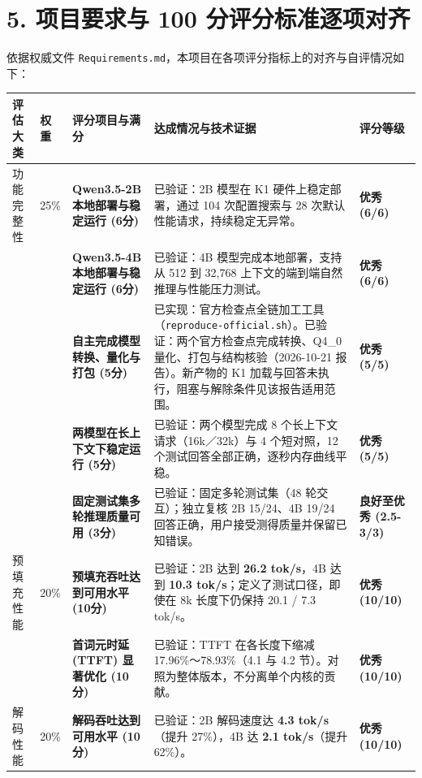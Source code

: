 \documentclass[10pt,a4paper,fontset=none]{ctexart}
\begin{document}
\section{5. 项目要求与 100 分评分标准逐项对齐}

依据权威文件 \texttt{Requirements.md}，本项目在各项评分指标上的对齐与自评情况如下：

\begin{scriptsize}
\setlength{\tabcolsep}{3pt}
\begin{longtable}{@{}p{1.9cm}p{0.9cm}p{4.3cm}p{6.9cm}p{2.0cm}@{}}
\toprule
\textbf{评估大类} & \textbf{权重} & \textbf{评分项目与满分} & \textbf{达成情况与技术证据} & \textbf{评分等级} \\
\midrule
\endhead
功能完整性 & 25\% & \textbf{Qwen3.5-2B 本地部署与稳定运行 (6分)} & 已验证：2B 模型在 K1 硬件上稳定部署，通过 104 次配置搜索与 28 次默认性能请求，持续稳定无异常。 & \textbf{优秀 (6/6)} \\
 & & \textbf{Qwen3.5-4B 本地部署与稳定运行 (6分)} & 已验证：4B 模型完成本地部署，支持从 512 到 32,768 上下文的端到端自然推理与性能压力测试。 & \textbf{优秀 (6/6)} \\
 & & \textbf{自主完成模型转换、量化与打包 (5分)} & 已实现：官方检查点全链加工工具（\texttt{reproduce-official.sh}）。已验证：两个官方检查点完成转换、Q4\_0 量化、打包与结构核验（2026-10-21 报告）。新产物的 K1 加载与回答未执行，阻塞与解除条件见该报告适用范围。 & \textbf{优秀 (5/5)} \\
 & & \textbf{两模型在长上下文下稳定运行 (5分)} & 已验证：两个模型完成 8 个长上下文请求（16k／32k）与 4 个短对照，12 个测试回答全部正确，逐秒内存曲线平稳。 & \textbf{优秀 (5/5)} \\
 & & \textbf{固定测试集多轮推理质量可用 (3分)} & 已验证：固定多轮测试集（48 轮交互）；独立复核 2B 15/24、4B 19/24 回答正确，用户接受测得质量并保留已知错误。 & \textbf{良好至优秀 (2.5-3/3)} \\
\midrule
预填充性能 & 20\% & \textbf{预填充吞吐达到可用水平 (10分)} & 已验证：2B 达到 \textbf{26.2 tok/s}，4B 达到 \textbf{10.3 tok/s}；定义了测试口径，即使在 8k 长度下仍保持 20.1 / 7.3 tok/s。 & \textbf{优秀 (10/10)} \\
 & & \textbf{首词元时延 (TTFT) 显著优化 (10分)} & 已验证：TTFT 在各长度下缩减 17.96\%～78.93\%（4.1 与 4.2 节）。对照为整体版本，不分离单个内核的贡献。 & \textbf{优秀 (10/10)} \\
\midrule
解码性能 & 20\% & \textbf{解码吞吐达到可用水平 (10分)} & 已验证：2B 解码速度达 \textbf{4.3 tok/s}（提升 27\%），4B 达 \textbf{2.1 tok/s}（提升 62\%）。 & \textbf{优秀 (10/10)} \\

\end{longtable}
\end{scriptsize}
\end{document}
